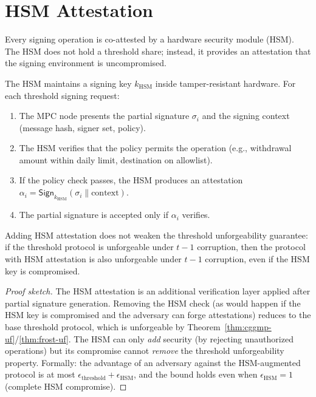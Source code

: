 \section{HSM Attestation}

\label{sec:hsm}

Every signing operation is co-attested by a hardware security module
(HSM).  The HSM does not hold a threshold share; instead, it provides
an attestation that the signing environment is uncompromised.

\begin{definition}
The HSM maintains a signing key $k_{\text{HSM}}$ inside tamper-resistant
hardware.  For each threshold signing request:
\begin{enumerate}[nosep]
  \item The MPC node presents the partial signature $\sigma_i$ and
        the signing context (message hash, signer set, policy).
  \item The HSM verifies that the policy permits the operation (e.g.,
        withdrawal amount within daily limit, destination on allowlist).
  \item If the policy check passes, the HSM produces an attestation
        $\alpha_i = \mathsf{Sign}_{k_{\text{HSM}}}(\sigma_i \|
        \text{context})$.
  \item The partial signature is accepted only if $\alpha_i$ verifies.
\end{enumerate}
\end{definition}

\begin{theorem}
\label{thm:hsm-compose}
Adding HSM attestation does not weaken the threshold unforgeability
guarantee: if the threshold protocol is unforgeable under $t-1$
corruption, then the protocol with HSM attestation is also unforgeable
under $t-1$ corruption, even if the HSM key is compromised.
\end{theorem}

\begin{proof}[Proof sketch]
The HSM attestation is an additional verification layer applied after
partial signature generation.  Removing the HSM check (as would happen
if the HSM key is compromised and the adversary can forge attestations)
reduces to the base threshold protocol, which is unforgeable by
Theorem~\ref{thm:cggmp-uf}/\ref{thm:frost-uf}.  The HSM can only
\emph{add} security (by rejecting unauthorized operations) but its
compromise cannot \emph{remove} the threshold unforgeability property.
Formally: the advantage of an adversary against the HSM-augmented
protocol is at most $\epsilon_{\text{threshold}} +
\epsilon_{\text{HSM}}$, and the bound holds even when
$\epsilon_{\text{HSM}} = 1$ (complete HSM compromise).
\end{proof}

